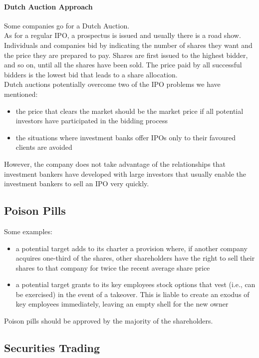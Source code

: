 \paragraph{Dutch Auction Approach}
Some companies go for a Dutch Auction.\\
As for a regular IPO, a prospectus is issued and usually there is a road show. Individuals and companies bid by indicating the number of shares they want and the price they are prepared to pay. Shares are first issued to the highest bidder, and so on, until all the shares have been sold. The price paid by all successful bidders is the lowest bid that leads to a share allocation.\\
Dutch auctions potentially overcome two of the IPO problems we have mentioned:
\begin{itemize}
	\item the price that clears the market should be the market price if all potential investors have participated in the bidding process
	\item the situations where investment banks offer IPOs only to their favoured clients are avoided
\end{itemize}
However, the company does not take advantage of the relationships that investment bankers have developed with large investors that usually enable the investment bankers to sell an IPO very quickly.

\subsection{Poison Pills}
Some examples:
\begin{itemize}
	\item a potential target adds to its charter a provision where, if another company acquires one-third of the shares, other shareholders have the right to sell their shares to that company for twice the recent average share price
	\item a potential target grants to its key employees stock options that vest (i.e., can be exercised) in the event of a takeover. This is liable to create an exodus of key employees immediately, leaving an empty shell for the new owner
\end{itemize}
Poison pills should be approved by the majority of the shareholders.

\subsection{Securities Trading}

